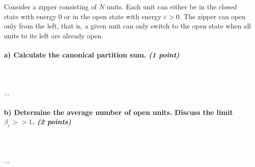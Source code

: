 Consider a zipper consisting of $N$ units. Each unit can either be in the 
closed state with energy 0 or in the open state with energy $\varepsilon>0$.
The zipper can open only from the left, that is, a given unit can only switch
to the open state when all units to its left are already open.

\paragraph{a) Calculate the canonical partition sum. \textit{(1 point)}} \ \\
    \\
    ...

\paragraph{b) Determine the average number of open units. Discuss the limit 
    $\beta_\varepsilon>>1$. \textit{(2 points)}} \ \\
    \\
    ...
 
